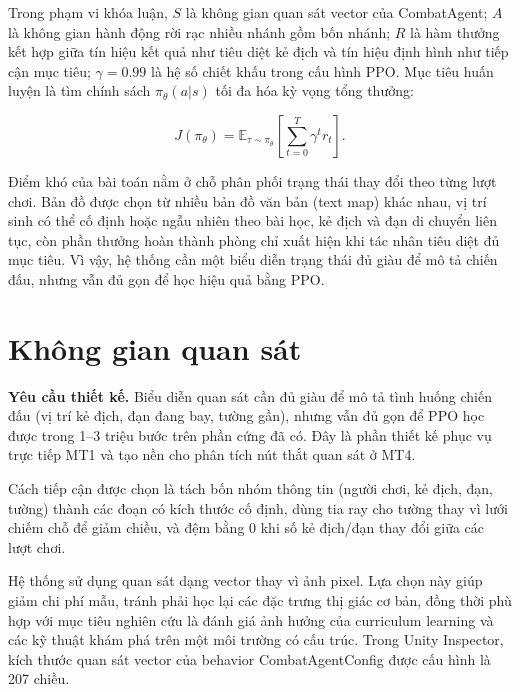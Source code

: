 Trong phạm vi khóa luận, $S$ là không gian quan sát vector của CombatAgent; $A$ là không gian hành động rời rạc nhiều nhánh gồm bốn nhánh; $R$ là hàm thưởng kết hợp giữa tín hiệu kết quả như tiêu diệt kẻ địch và tín hiệu định hình như tiếp cận mục tiêu; $\gamma=0.99$ là hệ số chiết khấu trong cấu hình PPO. Mục tiêu huấn luyện là tìm chính sách $\pi_{\theta}(a|s)$ tối đa hóa kỳ vọng tổng thưởng:

\begin{equation}
    J(\pi_\theta) = \mathbb{E}_{\tau \sim \pi_\theta}
    \left[\sum_{t=0}^{T}\gamma^t r_t\right].
\end{equation}

Điểm khó của bài toán nằm ở chỗ phân phối trạng thái thay đổi theo từng lượt chơi. Bản đồ được chọn từ nhiều bản đồ văn bản (text map) khác nhau, vị trí sinh có thể cố định hoặc ngẫu nhiên theo bài học, kẻ địch và đạn di chuyển liên tục, còn phần thưởng hoàn thành phòng chỉ xuất hiện khi tác nhân tiêu diệt đủ mục tiêu. Vì vậy, hệ thống cần một biểu diễn trạng thái đủ giàu để mô tả chiến đấu, nhưng vẫn đủ gọn để học hiệu quả bằng PPO.

\section{Không gian quan sát}

\textbf{Yêu cầu thiết kế.} Biểu diễn quan sát cần đủ giàu để mô tả tình huống chiến đấu (vị trí kẻ địch, đạn đang bay, tường gần), nhưng vẫn đủ gọn để PPO học được trong 1--3 triệu bước trên phần cứng đã có. Đây là phần thiết kế phục vụ trực tiếp MT1 và tạo nền cho phân tích nút thắt quan sát ở MT4.

Cách tiếp cận được chọn là tách bốn nhóm thông tin (người chơi, kẻ địch, đạn, tường) thành các đoạn có kích thước cố định, dùng tia ray cho tường thay vì lưới chiếm chỗ để giảm chiều, và đệm bằng 0 khi số kẻ địch/đạn thay đổi giữa các lượt chơi.

Hệ thống sử dụng quan sát dạng vector thay vì ảnh pixel. Lựa chọn này giúp giảm chi phí mẫu, tránh phải học lại các đặc trưng thị giác cơ bản, đồng thời phù hợp với mục tiêu nghiên cứu là đánh giá ảnh hưởng của curriculum learning và các kỹ thuật khám phá trên một môi trường có cấu trúc. Trong Unity Inspector, kích thước quan sát vector của behavior CombatAgentConfig được cấu hình là 207 chiều.

